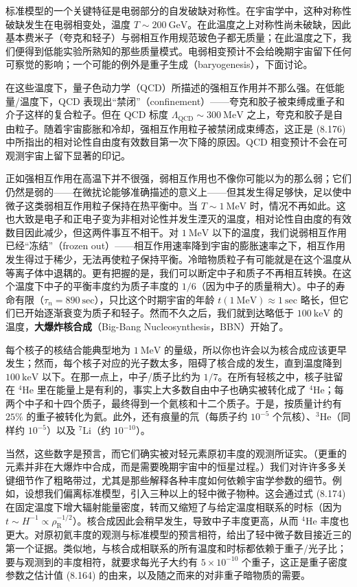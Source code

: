 标准模型的一个关键特征是电弱部分的自发破缺对称性。在宇宙学中，这种对称性破缺发生在电弱相变处，温度 $T\sim 200~\mathrm{GeV}$。在此温度之上对称性尚未破缺，因此基本费米子（夸克和轻子）与弱相互作用规范玻色子都无质量；在此温度之下，我们便得到低能实验所熟知的那些质量模式。电弱相变预计不会给晚期宇宙留下任何可察觉的影响；一个可能的例外是重子生成（baryogenesis），下面讨论。

在这些温度下，量子色动力学（QCD）所描述的强相互作用并不那么强。在低能量/温度下，QCD 表现出“禁闭”（confinement）——夸克和胶子被束缚成重子和介子这样的复合粒子。但在 QCD 标度 $\Lambda_{\mathrm{QCD}}\sim 300~\mathrm{MeV}$ 之上，夸克和胶子是自由粒子。随着宇宙膨胀和冷却，强相互作用粒子被禁闭成束缚态，这正是 (8.176) 中所指出的相对论性自由度有效数目第一次下降的原因。QCD 相变预计不会在可观测宇宙上留下显著的印记。

正如强相互作用在高温下并不很强，弱相互作用也不像你可能以为的那么弱；它们仍然是弱的——在微扰论能够准确描述的意义上——但其发生得足够快，足以使中微子这类弱相互作用粒子保持在热平衡中。当 $T\sim 1~\mathrm{MeV}$ 时，情况不再如此。这也大致是电子和正电子变为非相对论性并发生湮灭的温度，相对论性自由度的有效数目因此减少，但这两件事互不相干。对 $1~\mathrm{MeV}$ 以下的温度，我们说弱相互作用已经“冻结”（frozen out）——相互作用速率降到宇宙的膨胀速率之下，相互作用发生得过于稀少，无法再使粒子保持平衡。冷暗物质粒子有可能就是在这个温度从等离子体中退耦的。更有把握的是，我们可以断定中子和质子不再相互转换。在这个温度下中子的平衡丰度约为质子丰度的 $1/6$（因为中子的质量稍大）。中子的寿命有限（$\tau_{n}=890~\mathrm{sec}$），只比这个时期宇宙的年龄 $t(1~\mathrm{MeV})\approx 1~\mathrm{sec}$ 略长，但它们已开始逐渐衰变为质子和轻子。然而不久之后，我们就到达略低于 $100~\mathrm{keV}$ 的温度，\textbf{大爆炸核合成}（Big-Bang Nucleosynthesis，BBN）开始了。

每个核子的核结合能典型地为 $1~\mathrm{MeV}$ 的量级，所以你也许会以为核合成应该更早发生；然而，每个核子对应的光子数太多，阻碍了核合成的发生，直到温度降到 $100~\mathrm{keV}$ 以下。在那一点上，中子/质子比约为 $1/7$。在所有轻核之中，核子驻留在 $^{4}\mathrm{He}$ 里在能量上是有利的，事实上大多数自由中子也确实被转化成了 $^{4}\mathrm{He}$；每两个中子和十四个质子，最终得到一个氦核和十二个质子。于是，按质量计约有 $25\%$ 的重子被转化为氦。此外，还有痕量的氘（每质子约 $10^{-5}$ 个氘核）、$^{3}\mathrm{He}$（同样约 $10^{-5}$）以及 $^{7}\mathrm{Li}$（约 $10^{-10}$）。

当然，这些数字是预言，而它们确实被对轻元素原初丰度的观测所证实。（更重的元素并非在大爆炸中合成，而是需要晚期宇宙中的恒星过程。）我们对许许多多关键细节作了粗略带过，尤其是那些解释各种丰度如何依赖宇宙学参数的细节。例如，设想我们偏离标准模型，引入三种以上的轻中微子物种。这会通过式 (8.174) 在固定温度下增大辐射能量密度，转而又缩短了与给定温度相联系的时标（因为 $t\sim H^{-1}\propto\rho_{\mathrm{R}}^{-1/2}$）。核合成因此会稍早发生，导致中子丰度更高，从而 $^{4}\mathrm{He}$ 丰度也更大。对原初氦丰度的观测与标准模型的预言相符，给出了轻中微子数目接近三的第一个证据。类似地，与核合成相联系的所有温度和时标都依赖于重子/光子比；要与观测到的丰度相符，就要求每光子大约有 $5\times 10^{-10}$ 个重子，这正是重子密度参数之估计值 (8.164) 的由来，以及随之而来的对非重子暗物质的需要。

